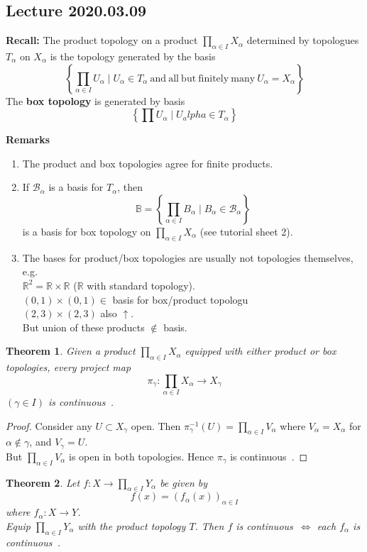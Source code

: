 \documentclass{article}
\newcommand{\R}{\mathbb{R}}
\newcommand{\cts}{continuous\ }
\newcommand{\ba}{\mathcal{B}}
\newtheorem{stheorem}{Theorem}[theorem]
\theoremstyle{remark}
\theoremstyle{example}
\theoremstyle{examples}
\begin{document}
	\subsection*{Lecture 2020.03.09}
	\textbf{Recall:} The product topology on a product $\prod_{\alpha \in I} X_\alpha$ determined by topologues $T_\alpha$ on $X_\alpha$ is the topology generated by the basis \[\left\{ \prod_{\alpha \in I} U_\alpha \mid U_\alpha \in T_\alpha\ \mathrm{and\ all\ but\ finitely\ many\ } U_\alpha=X_\alpha \right\}\]
	The \textbf{box topology} is generated by basis \[ \left\{\prod U_\alpha \mid U_alpha \in T_\alpha \right\}\]
	
	\textbf{Remarks}
	\begin{enumerate}
		\item The product and box topologies agree for finite products.
		\item If $\ba_\alpha$ is a basis for $T_\alpha$, then \[\mathbb{B}=\left\{ \prod_{\alpha \in I}B_\alpha \mid B_\alpha \in \ba_\alpha \right\}\] is a basis for box topology on $\prod_{\alpha \in I} X_\alpha$ (see tutorial sheet 2).
		\item The bases for product/box topologies are usually not topologies themselves, e.g.\\
		$\R^2=\R \times \R$ ($\R$ with standard topology).\\
		$(0,1) \times (0,1) \in$ basis for box/product topologu\\
		$(2,3) \times (2,3)$ also $\uparrow$.\\
		But union of these products $\notin$ basis.
	\end{enumerate}

	\begin{stheorem}
		\label{productmapscts}
		Given a product $\prod_{\alpha \in I}X_\alpha$ equipped with either product or box topologies, every project map \[\pi_\gamma: \prod_{\alpha \in I} X_\alpha \to X_\gamma \]
		$(\gamma \in I)$ is \cts.
	\end{stheorem}
	\begin{proof}
		Consider any $U \subset X_\gamma$ open. Then $\pi_\gamma^{-1}(U)=\prod_{\alpha \in I}V_\alpha$ where $V_\alpha=X_\alpha$ for $\alpha \notin \gamma$, and $V_\gamma = U$.\\
		But $\prod_{\alpha \in I}V_\alpha$ is open in both topologies. Hence $\pi_\gamma$ is \cts.
	\end{proof}

	\begin{stheorem}
		\label{fisctsiffeachfalphaiscts}
		Let $f:X \to \prod_{\alpha \in I}Y_\alpha$ be given by \[f(x)=\left( f_\alpha \left(x\right) \right)_{\alpha \in I}\] where $f_\alpha:X \to Y$.\\
		Equip $\prod_{\alpha \in I}Y_\alpha$ with the product topology $T$. Then $f$ is \cts $\iff$ each $f_\alpha$ is \cts.
	\end{stheorem}
\end{document}
